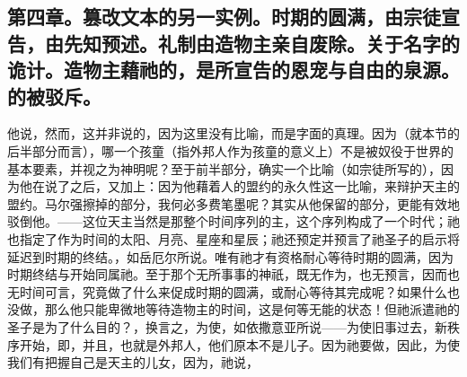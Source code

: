 
\subsection{第四章。篡改文本的另一实例。时期的圆满，由宗徒宣告，由先知预述。礼制由造物主亲自废除。关于名字的诡计。造物主藉祂的，是所宣告的恩宠与自由的泉源。的被驳斥。}

他说，然而，这并非说的，因为这里没有比喻，而是字面的真理。因为（就本节的后半部分而言），哪一个孩童（指外邦人作为孩童的意义上）不是被奴役于世界的基本要素，并视之为神明呢？至于前半部分，确实一个比喻（如宗徒所写的），因为他在说了之后，又加上：因为他藉着人的盟约的永久性这一比喻，来辩护天主的盟约。马尔强擦掉的部分，我何必多费笔墨呢？其实从他保留的部分，更能有效地驳倒他。——这位天主当然是那整个时间序列的主，这个序列构成了一个时代；祂也指定了作为时间的太阳、月亮、星座和星辰；祂还预定并预言了祂圣子的启示将延迟到时期的终结。，如岳厄尔所说。唯有祂才有资格耐心等待时期的圆满，因为时期终结与开始同属祂。至于那个无所事事的神祇，既无作为，也无预言，因而也无时间可言，究竟做了什么来促成时期的圆满，或耐心等待其完成呢？如果什么也没做，那么他只能卑微地等待造物主的时间，这是何等无能的状态！但祂派遣祂的圣子是为了什么目的？，换言之，为使，如依撒意亚所说——为使旧事过去，新秩序开始，即，并且，也就是外邦人，他们原本不是儿子。因为祂要做，因此，为使我们有把握自己是天主的儿女，因为，祂说，\par

